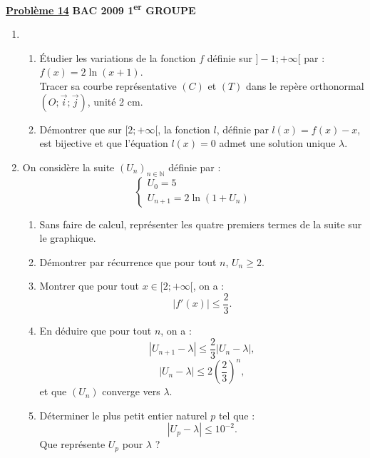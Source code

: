 \documentclass[12pt,a4paper]{article}
\newcommand{\exo}[1]{%
        \textbf{\underline{Problème #1}}
}
\begin{document}
\begin{multicols}{2}
\exo{14} \textbf{BAC 2009 1\textsuperscript{er} GROUPE}

\begin{enumerate}
    \item 
    \begin{enumerate}
        \item Étudier les variations de la fonction \( f \) définie sur \( ]-1 ; +\infty[ \) par : \( f(x) = 2 \ln(x + 1) \).\\
        Tracer sa courbe représentative \( (C) \) et \( (T) \) dans le repère orthonormal \( (O ; \vec{i} ; \vec{j}) \), unité 2 cm.

        \item Démontrer que sur \( [2 ; +\infty[ \), la fonction \( l \), définie par \( l(x) = f(x) - x \), est bijective et que l’équation \( l(x) = 0 \) admet une solution unique \( \lambda \).
    \end{enumerate}

    \item On considère la suite \( (U_n)_{n \in \mathbb{N}} \) définie par :
    \[
    \begin{cases}
    U_0 = 5 \\
    U_{n+1} = 2 \ln(1 + U_n)
    \end{cases}
    \]

    \begin{enumerate}
        \item Sans faire de calcul, représenter les quatre premiers termes de la suite sur le graphique.

        \item Démontrer par récurrence que pour tout \( n \), \( U_n \geq 2 \).

        \item Montrer que pour tout \( x \in [2 ; +\infty[ \), on a :
        \[
        |f'(x)| \leq \dfrac{2}{3}.
        \]

        \item En déduire que pour tout \( n \), on a :
        \[
        |U_{n+1} - \lambda| \leq \dfrac{2}{3} |U_n - \lambda|,
        \]
        \[
        |U_n - \lambda| \leq 2 \left( \dfrac{2}{3} \right)^n,
        \]
        et que \( (U_n) \) converge vers \( \lambda \).

        \item Déterminer le plus petit entier naturel \( p \) tel que :
        \[
        |U_p - \lambda| \leq 10^{-2}.
        \]
        Que représente \( U_p \) pour \( \lambda \) ?
    \end{enumerate}
\end{enumerate}

\end{multicols}
\end{document}
